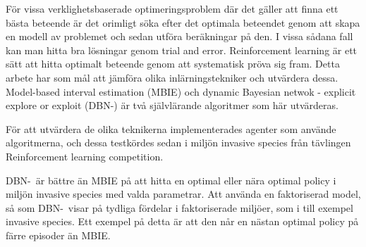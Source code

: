 För vissa verklighetsbaserade optimeringsproblem där det gäller att finna ett bästa beteende är det orimligt söka efter det optimala beteendet genom att skapa en modell av problemet och sedan utföra beräkningar på den. I vissa sådana fall kan man hitta bra lösningar genom trial and error. Reinforcement learning är ett sätt att hitta optimalt beteende genom att systematisk pröva sig fram.
Detta arbete har som mål att jämföra olika inlärningstekniker och utvärdera dessa.
Model-based interval estimation (MBIE) och dynamic Bayesian netwok - explicit explore or exploit (DBN-\etre) är 
två självlärande algoritmer som här utvärderas.

För att utvärdera de olika teknikerna implementerades agenter som använde algoritmerna, och dessa testkördes sedan 
i miljön invasive species från tävlingen Reinforcement learning competition.

DBN-\etre\ är bättre än MBIE på att hitta en optimal eller nära optimal policy i miljön invasive species med valda parametrar.
Att använda en faktoriserad model, så som DBN-\etre\, visar på tydliga fördelar i faktoriserade miljöer, som i till exempel invasive species. 
Ett exempel på detta är att den når en nästan optimal policy på färre episoder än MBIE.





